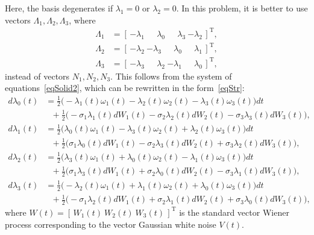 \documentclass[10pt,reqno]{amsart}
\newcommand{\trans}{{\scriptscriptstyle \mathrm{T}}}
\theoremstyle{plain}
\theoremstyle{remark}
\begin{document}
Here, the basis degenerates if $\lambda_1 = 0$ or $\lambda_2 = 0$. In this problem, it is better to use vectors $\Lambda_1,\Lambda_2,\Lambda_3$, where
\begin{align*}
  \Lambda_1 & = [ \, {-\lambda_1} ~ \phantom{-}\lambda_0 ~ \phantom{-}\lambda_3 ~ {-\lambda_2} \, ]^\trans, \\
  \Lambda_2 & = [ \, {-\lambda_2} ~ {-\lambda_3} ~ \phantom{-}\lambda_0 ~ \phantom{-}\lambda_1 \, ]^\trans, \\
  \Lambda_3 & = [ \, {-\lambda_3} ~ \phantom{-}\lambda_2 ~ {-\lambda_1} ~ \phantom{-}\lambda_0 \, ]^\trans,
\end{align*}
instead of vectors $N_1,N_2,N_3$. This follows from the system of equations~\eqref{eqSolid2}, which can be rewritten in the form~\eqref{eqStr}:
\begin{equation}\label{eqSolid3}
  \begin{aligned}
    d\lambda_0(t) & = \tfrac{1}{2} \bigl( -\lambda_1(t) \omega_1(t) - \lambda_2(t) \omega_2(t) - \lambda_3(t) \omega_3(t) \bigr) dt \\
    & \ \ \ {} + \tfrac{1}{2} \bigl( -\sigma_1 \lambda_1(t) dW_1(t) - \sigma_2 \lambda_2(t) dW_2(t) - \sigma_3 \lambda_3(t) dW_3(t) \bigr), \\
    d\lambda_1(t) & = \tfrac{1}{2} \bigl( \lambda_0(t) \omega_1(t) - \lambda_3(t) \omega_2(t) + \lambda_2(t) \omega_3(t) \bigr) dt \\
    & \ \ \ {} + \tfrac{1}{2} \bigl( \sigma_1 \lambda_0(t) dW_1(t) - \sigma_2 \lambda_3(t) dW_2(t) + \sigma_3 \lambda_2(t) dW_3(t) \bigr), \\
    d\lambda_2(t) & = \tfrac{1}{2} \bigl( \lambda_3(t) \omega_1(t) + \lambda_0(t) \omega_2(t) - \lambda_1(t) \omega_3(t) \bigr) dt \\
    & \ \ \ {} + \tfrac{1}{2} \bigl( \sigma_1 \lambda_3(t) dW_1(t) + \sigma_2 \lambda_0(t) dW_2(t) - \sigma_3 \lambda_1(t) dW_3(t) \bigr), \\
    d\lambda_3(t) & = \tfrac{1}{2} \bigl( -\lambda_2(t) \omega_1(t) + \lambda_1(t) \omega_2(t) + \lambda_0(t) \omega_3(t) \bigr) dt \\
    & \ \ \ {} + \tfrac{1}{2} \bigl( -\sigma_1 \lambda_2(t) dW_1(t) + \sigma_2 \lambda_1(t) dW_2(t) + \sigma_3 \lambda_0(t) dW_3(t) \bigr),
  \end{aligned}
\end{equation}
where $W(t) = [ \, W_1(t) ~ W_2(t) ~ W_3(t) \, ]^\trans$ is the standard vector Wiener process corresponding to the vector Gaussian white noise $V(t)$.
\end{document}
